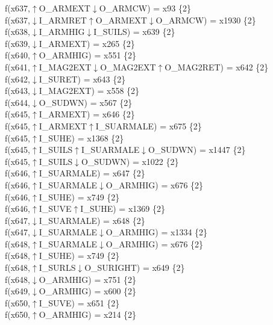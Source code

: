f(x637,$\uparrow$O\_ARMEXT$\downarrow$O\_ARMCW) = x93 \{2\} \\  
f(x637,$\downarrow$I\_ARMRET$\uparrow$O\_ARMEXT$\downarrow$O\_ARMCW) = x1930 \{2\} \\  
f(x638,$\downarrow$I\_ARMHIG$\downarrow$I\_SUILS) = x639 \{2\} \\  
f(x639,$\downarrow$I\_ARMEXT) = x265 \{2\} \\  
f(x640,$\uparrow$O\_ARMHIG) = x551 \{2\} \\  
f(x641,$\uparrow$I\_MAG2EXT$\downarrow$O\_MAG2EXT$\uparrow$O\_MAG2RET) = x642 \{2\} \\  
f(x642,$\downarrow$I\_SURET) = x643 \{2\} \\  
f(x643,$\downarrow$I\_MAG2EXT) = x558 \{2\} \\  
f(x644,$\downarrow$O\_SUDWN) = x567 \{2\} \\  
f(x645,$\uparrow$I\_ARMEXT) = x646 \{2\} \\  
f(x645,$\uparrow$I\_ARMEXT$\uparrow$I\_SUARMALE) = x675 \{2\} \\  
f(x645,$\uparrow$I\_SUHE) = x1368 \{2\} \\  
f(x645,$\uparrow$I\_SUILS$\uparrow$I\_SUARMALE$\downarrow$O\_SUDWN) = x1447 \{2\} \\  
f(x645,$\uparrow$I\_SUILS$\downarrow$O\_SUDWN) = x1022 \{2\} \\  
f(x646,$\uparrow$I\_SUARMALE) = x647 \{2\} \\  
f(x646,$\uparrow$I\_SUARMALE$\downarrow$O\_ARMHIG) = x676 \{2\} \\  
f(x646,$\uparrow$I\_SUHE) = x749 \{2\} \\  
f(x646,$\uparrow$I\_SUVE$\uparrow$I\_SUHE) = x1369 \{2\} \\  
f(x647,$\downarrow$I\_SUARMALE) = x648 \{2\} \\  
f(x647,$\downarrow$I\_SUARMALE$\downarrow$O\_ARMHIG) = x1334 \{2\} \\  
f(x648,$\uparrow$I\_SUARMALE$\downarrow$O\_ARMHIG) = x676 \{2\} \\  
f(x648,$\uparrow$I\_SUHE) = x749 \{2\} \\  
f(x648,$\uparrow$I\_SURLS$\downarrow$O\_SURIGHT) = x649 \{2\} \\  
f(x648,$\downarrow$O\_ARMHIG) = x751 \{2\} \\  
f(x649,$\downarrow$O\_ARMHIG) = x600 \{2\} \\  
f(x650,$\uparrow$I\_SUVE) = x651 \{2\} \\  
f(x650,$\uparrow$O\_ARMHIG) = x214 \{2\} \\  
